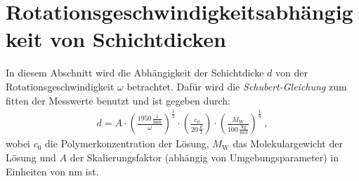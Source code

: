 
\newpage
\section{Rotationsgeschwindigkeitsabhängigkeit von Schichtdicken}
\label{sec:rot}

In diesem Abschnitt wird die Abhängigkeit der Schichtdicke $d$ von der Rotationsgeschwindigkeit $\omega$ betrachtet. Dafür wird die \textit{Schubert-Gleichung} zum fitten der Messwerte benutzt und ist gegeben durch:
\begin{gather}
    d = A \cdot \left(\frac{1950\,\frac{1}{\mathrm{min}}}{\omega}\right)^{\frac{1}{2}} \cdot \left(\frac{c_0}{20\,\frac{\mathrm{g}}{\mathrm{l}}}\right)\cdot\left(\frac{M_\mathrm{W}}{100\,\frac{\mathrm{kg}}{\mathrm{mol}}}\right)^{\frac{1}{4}}~,
    \label{eq:schubert}
\end{gather}
wobei $c_0$ die Polymerkonzentration der Lösung, $M_\mathrm{W}$ das Molekulargewicht der Lösung und $A$ der Skalierungsfaktor (abhängig von Umgebungsparameter) in Einheiten von nm ist. \cite{Ruderer2009}

